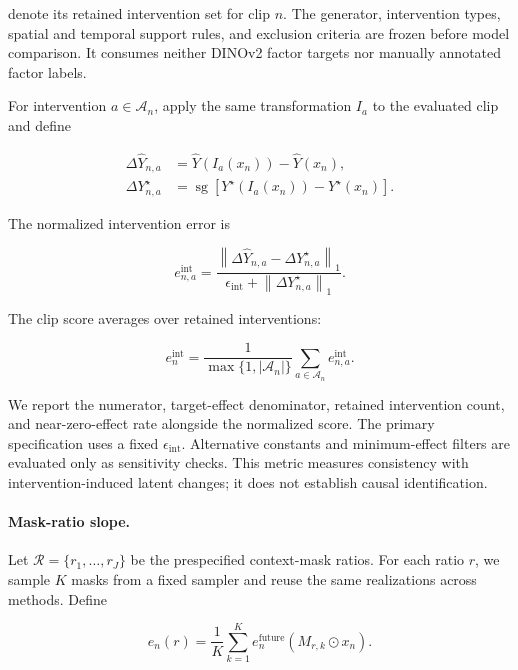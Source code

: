 denote its retained intervention set for clip \(n\). The generator,
intervention types, spatial and temporal support rules, and exclusion
criteria are frozen before model comparison. It consumes neither
DINOv2 factor targets nor manually annotated factor labels.

For intervention \(a\in\mathcal A_n\), apply the same transformation
\(I_a\) to the evaluated clip and define

\begin{equation*}
\begin{aligned}
\Delta\widehat Y_{n,a}
&=
\widehat Y\!\left(I_a(x_n)\right)
-
\widehat Y(x_n),
\\
\Delta Y^\star_{n,a}
&=
\operatorname{sg}
\left[
Y^\star\!\left(I_a(x_n)\right)
-
Y^\star(x_n)
\right].
\end{aligned}
\end{equation*}

The normalized intervention error is

\begin{equation*}
e_{n,a}^{\mathrm{int}}
=
\frac{
\left\|
\Delta\widehat Y_{n,a}
-
\Delta Y^\star_{n,a}
\right\|_1
}{
\epsilon_{\mathrm{int}}
+
\left\|
\Delta Y^\star_{n,a}
\right\|_1
}.
\end{equation*}

The clip score averages over retained interventions:

\begin{equation*}
e_n^{\mathrm{int}}
=
\frac{1}{\max\{1,|\mathcal A_n|\}}
\sum_{a\in\mathcal A_n}
e_{n,a}^{\mathrm{int}} .
\end{equation*}

We report the numerator, target-effect denominator, retained
intervention count, and near-zero-effect rate alongside the normalized
score. The primary specification uses a fixed
\(\epsilon_{\mathrm{int}}\). Alternative constants and minimum-effect
filters are evaluated only as sensitivity checks. This metric measures
consistency with intervention-induced latent changes; it does not
establish causal identification.

\paragraph{Mask-ratio slope.}
Let \(\mathcal R=\{r_1,\ldots,r_J\}\) be the prespecified context-mask
ratios. For each ratio \(r\), we sample \(K\) masks from a fixed sampler
and reuse the same realizations across methods. Define

\begin{equation*}
e_n(r)
=
\frac{1}{K}
\sum_{k=1}^{K}
e_n^{\mathrm{future}}
\left(
M_{r,k}\odot x_n
\right).
\end{equation*}

